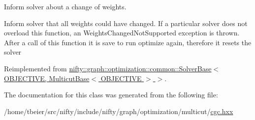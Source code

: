 Inform solver about a change of weights. 

Inform solver that all weights could have changed. If a particular solver does not overload this function, an Weights\+Changed\+Not\+Supported exception is thrown. After a call of this function it is save to run optimize again, therefore it resets the solver 

Reimplemented from \hyperlink{classnifty_1_1graph_1_1optimization_1_1common_1_1SolverBase_a8ab38d61068370e24cca475ef1b5d8b1}{nifty\+::graph\+::optimization\+::common\+::\+Solver\+Base$<$ O\+B\+J\+E\+C\+T\+I\+V\+E, Multicut\+Base$<$ O\+B\+J\+E\+C\+T\+I\+V\+E $>$ $>$}.



The documentation for this class was generated from the following file\+:\begin{DoxyCompactItemize}
\item 
/home/tbeier/src/nifty/include/nifty/graph/optimization/multicut/\hyperlink{cgc_8hxx}{cgc.\+hxx}\end{DoxyCompactItemize}
